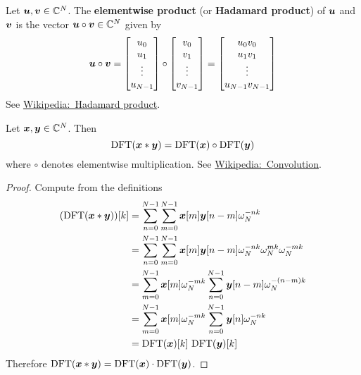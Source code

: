 \begin{definition}
Let $\boldsymbol{u}, \boldsymbol{v} \in \mathbb{C}^N$. The {\bf elementwise product} (or {\bf Hadamard product}) of $\boldsymbol{u}$ and $\boldsymbol{v}$ is the vector $\boldsymbol{u} \circ \boldsymbol{v} \in \mathbb{C}^N$ given by
$$
\boldsymbol{u} \circ \boldsymbol{v} =
\begin{bmatrix} u_0 \\ u_1 \\ \vdots \\ u_{N-1} \end{bmatrix}
\circ
\begin{bmatrix} v_0 \\ v_1 \\ \vdots \\ v_{N-1} \end{bmatrix}
=
\begin{bmatrix} u_0v_0 \\ u_1v_1 \\ \vdots \\ u_{N-1}v_{N-1} \end{bmatrix}
$$
See \href{https://en.wikipedia.org/wiki/Hadamard_product_(matrices)}{Wikipedia:~Hadamard product}.
\end{definition}

\begin{theorem}
Let $\boldsymbol{x}, \boldsymbol{y} \in \mathbb{C}^N$. Then
$$
\mathrm{DFT}( \boldsymbol{x} * \boldsymbol{y} ) = \mathrm{DFT}(\boldsymbol{x}) \circ \mathrm{DFT}(\boldsymbol{y})
$$
where $\circ$ denotes elementwise multiplication. See \href{https://en.wikipedia.org/wiki/Convolution}{Wikipedia:~Convolution}.

\begin{proof}
Compute from the definitions
\begin{align*}
(\mathrm{DFT}(\boldsymbol{x} * \boldsymbol{y}))[k] &= \sum_{n=0}^{N-1} \sum_{m=0}^{N-1} \boldsymbol{x}[m] \boldsymbol{y}[n - m] \omega_N^{-n k} \\
&= \sum_{n=0}^{N-1} \sum_{m=0}^{N-1} \boldsymbol{x}[m] \boldsymbol{y}[n - m] \omega_N^{-n k} \omega_N^{m k} \omega_N^{-m k} \\
&= \sum_{m=0}^{N-1} \boldsymbol{x}[m] \omega_N^{-m k} \sum_{n=0}^{N-1}  \boldsymbol{y}[n - m] \omega_N^{-(n-m) k} \\
&= \sum_{m=0}^{N-1} \boldsymbol{x}[m] \omega_N^{-m k} \sum_{n=0}^{N-1}  \boldsymbol{y}[n] \omega_N^{-n k} \\
&= \mathrm{DFT}(\boldsymbol{x})[k] \ \mathrm{DFT}(\boldsymbol{y})[k]
\end{align*}
Therefore $\mathrm{DFT}( \boldsymbol{x} * \boldsymbol{y} ) = \mathrm{DFT}(\boldsymbol{x}) \cdot \mathrm{DFT}(\boldsymbol{y})$.
\end{proof}
\end{theorem}